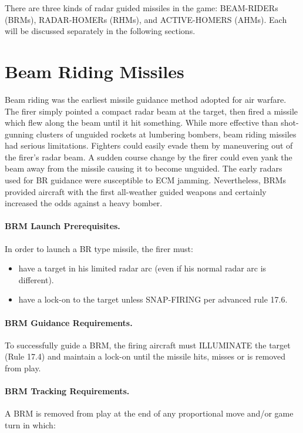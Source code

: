 
There are three kinds of radar guided missiles in the game: BEAM-RIDERs (BRMs), RADAR-HOMERs (RHMs), and ACTIVE-HOMERS (AHMs). Each will be discussed separately in the following sections.

\section{Beam Riding Missiles}
\label{rule:beam-riding-missiles}

Beam riding was the earliest missile guidance method adopted for air warfare. The firer simply pointed a compact radar beam at the target, then fired a missile which flew along the beam until it hit something. While more effective than shot-gunning clusters of unguided rockets at lumbering bombers, beam riding missiles had serious limitations. Fighters could easily evade them by maneuvering out of the firer's radar beam. A sudden course change by the firer could even yank the beam away from the missile causing it to become unguided. The early radars used for BR guidance were susceptible to ECM jamming. Nevertheless, BRMs provided aircraft with the first all-weather guided weapons and certainly increased the odds against a heavy bomber.

\paragraph{BRM Launch Prerequisites.} In order to launch a BR type missile, the firer must:

\begin{itemize}

    \item have a target in his limited radar arc (even if his normal radar arc is different).

    \item have a lock-on to the target unless SNAP-FIRING per advanced rule 17.6.

\end{itemize}

\paragraph{BRM Guidance Requirements.} To successfully guide a BRM, the firing aircraft must ILLUMINATE the target (Rule 17.4) and maintain a lock-on until the missile hits, misses or is removed from play.

\paragraph{BRM Tracking Requirements.} A BRM is removed from play at the end of any proportional move and/or game turn in which:

